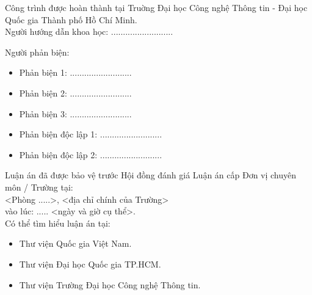 \noindent
Công trình được hoàn thành tại Truờng Đại học Công nghệ Thông tin - Đại học Quốc gia Thành phố Hồ Chí Minh. \\

\noindent
Người hướng dẫn khoa học: .......................... 

\noindent
Người phản biện: 
\begin{itemize}
    \item Phản biện 1: ..........................
    \item Phản biện 2: ..........................
    \item Phản biện 3: ..........................
\end{itemize}
\begin{itemize}
    \item Phản biện độc lập 1: ..........................
    \item Phản biện độc lập 2: ..........................
\end{itemize}


\noindent
Luận án đã được bảo vệ trước Hội đồng đánh giá Luận án cấp Đơn vị chuyên môn / Trường tại: \\
\noindent
<Phòng .....>, <địa chỉ chính của Trường> 
\\
\noindent
vào lúc: ..... <ngày và giờ cụ thể>. \\

\noindent
Có thể tìm hiểu luận án tại: 
\begin{itemize}
    \item Thư viện Quốc gia Việt Nam. 
    \item Thư viện Đại học Quốc gia TP.HCM.
    \item Thư viện Trường Đại học Công nghệ Thông tin.
\end{itemize}

\noindent
